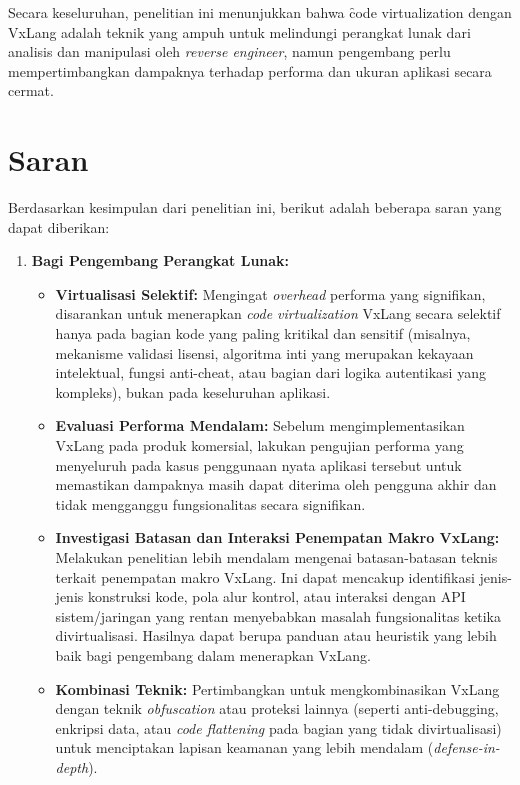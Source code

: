Secara keseluruhan, penelitian ini menunjukkan bahwa \f{code virtualization} dengan VxLang adalah teknik yang ampuh untuk melindungi perangkat lunak dari analisis dan manipulasi oleh \textit{reverse engineer}, namun pengembang perlu mempertimbangkan dampaknya terhadap performa dan ukuran aplikasi secara cermat.

\section{Saran}
Berdasarkan kesimpulan dari penelitian ini, berikut adalah beberapa saran yang dapat diberikan:

\begin{enumerate}
    \item \textbf{Bagi Pengembang Perangkat Lunak:}
        \begin{itemize}
            \item \textbf{Virtualisasi Selektif:} Mengingat \textit{overhead} performa yang signifikan, disarankan untuk menerapkan \textit{code virtualization} VxLang secara selektif hanya pada bagian kode yang paling kritikal dan sensitif (misalnya, mekanisme validasi lisensi, algoritma inti yang merupakan kekayaan intelektual, fungsi anti-cheat, atau bagian dari logika autentikasi yang kompleks), bukan pada keseluruhan aplikasi.
            \item \textbf{Evaluasi Performa Mendalam:} Sebelum mengimplementasikan VxLang pada produk komersial, lakukan pengujian performa yang menyeluruh pada kasus penggunaan nyata aplikasi tersebut untuk memastikan dampaknya masih dapat diterima oleh pengguna akhir dan tidak mengganggu fungsionalitas secara signifikan.
            \item \textbf{Investigasi Batasan dan Interaksi Penempatan Makro VxLang:} Melakukan penelitian lebih mendalam mengenai batasan-batasan teknis terkait penempatan makro VxLang. Ini dapat mencakup identifikasi jenis-jenis konstruksi kode, pola alur kontrol, atau interaksi dengan API sistem/jaringan yang rentan menyebabkan masalah fungsionalitas ketika divirtualisasi. Hasilnya dapat berupa panduan atau heuristik yang lebih baik bagi pengembang dalam menerapkan VxLang.
            \item \textbf{Kombinasi Teknik:} Pertimbangkan untuk mengkombinasikan VxLang dengan teknik \textit{obfuscation} atau proteksi lainnya (seperti anti-debugging, enkripsi data, atau \textit{code flattening} pada bagian yang tidak divirtualisasi) untuk menciptakan lapisan keamanan yang lebih mendalam (\textit{defense-in-depth}).
        \end{itemize}


\end{enumerate}

